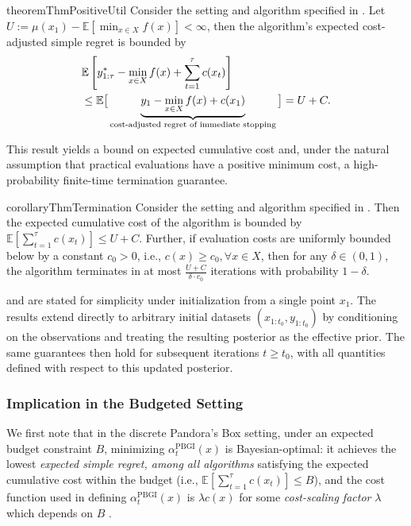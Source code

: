 \begin{restatable}{theorem}{ThmPositiveUtil} 
\label{thm:non_neg_util}
Consider the setting and algorithm specified in . Let $U:= \mu(x_1) - \mathbb{E}[\min_{x\in X}f(x)]<\infty$, 
then the algorithm's expected cost-adjusted simple regret is bounded by
\begin{align}&\mathbb{E}\left[y_{1:\tau}^* - \min_{x\in X}f(x) + \sum_{t=1}^{\tau} c(x_t)\right]
    \nonumber\\
    &\leq \mathbb{E}\big[
        \underbrace{
        y_{1} - \min_{x\in X}f(x) + c(x_1)}_{\textnormal{cost-adjusted regret of immediate stopping}}
    \big]
    = U+C.\label{eqn:cost_adjusted_regret_bound}
\end{align}
\end{restatable}
\vspace{-6pt}
This result yields a bound on expected cumulative cost and, under the natural assumption that practical evaluations have a positive minimum cost, a high-probability finite-time termination guarantee.
\begin{restatable}{corollary}{ThmTermination}
    Consider the setting and algorithm specified in . Then the expected cumulative cost of the algorithm is bounded by   $\mathbb{E}\left[\sum_{t=1}^{\tau} c(x_t)\right] \leq U+ C$. Further, if evaluation costs are uniformly bounded below by a constant $c_0>0$, i.e., $c(x)\geq c_0, \forall x \in X$, then for any $\delta \in (0, 1)$, the algorithm terminates in at most $\frac{U +C}{\delta \cdot c_0}$ iterations with probability $1 - \delta$.     
\end{restatable}

\begin{remark}
 and  are stated for simplicity under initialization from a single point $x_1$. The results extend directly to arbitrary initial datasets $(x_{1:t_0},y_{1:t_0})$ by conditioning on the observations and treating the resulting posterior as the effective prior. The same guarantees then hold for subsequent iterations $t\geq t_0$, with all quantities defined with respect to this updated posterior.
\end{remark}

\subsubsection{Implication in the Budgeted Setting}
\label{subsubsec:budget-constrained}
We first note that in the discrete Pandora's Box setting, under an expected budget constraint $B$, minimizing $\alpha_t^{\mathrm{PBGI}}(x)$ is Bayesian-optimal: it achieves the lowest \emph{expected simple regret, among all algorithms} satisfying the expected cumulative cost within the budget (i.e., 
$\mathbb{E}\left[\sum_{t=1}^{\tau} c(x_t)\right] \leq B$), and the cost function used in defining $\alpha_t^{\mathrm{PBGI}}(x)$ is $\lambda c(x)$ for some \emph{cost-scaling factor} $\lambda$ which depends on $B$ \citep[Theorem 2]{xie2024cost}.

